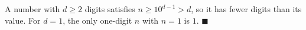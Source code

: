 A number with $d\ge2$ digits satisfies $n\ge10^{d-1}>d$, so it has fewer digits than its value. For $d=1$, the only one-digit $n$ with $n=1$ is $1$. $\blacksquare$
